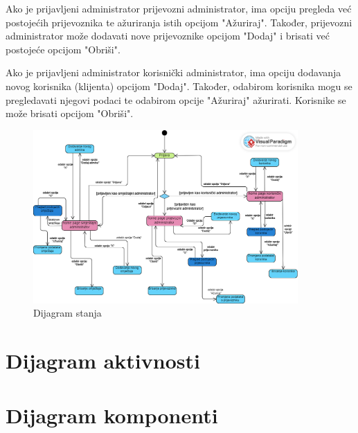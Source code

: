 			Ako je prijavljeni administrator prijevozni administrator, ima opciju pregleda već postojećih prijevoznika te ažuriranja istih opcijom "Ažuriraj". Također, prijevozni administrator može dodavati nove prijevoznike opcijom "Dodaj" i brisati već postojeće opcijom "Obriši".
			
			Ako je prijavljeni administrator korisnički administrator, ima opciju dodavanja novog korisnika (klijenta) opcijom "Dodaj". Također, odabirom korisnika mogu se pregledavati njegovi podaci te odabirom opcije "Ažuriraj" ažurirati. Korisnike se može brisati opcijom "Obriši".
			
			\begin{figure}[htbp]
				\centering
				\includegraphics[width=0.9\textwidth]{dijagrami/dijagramStanja.png}
				\caption{Dijagram stanja}
				\label{fig:dijagramStanja}
			\end{figure}
			
			
			\eject 
		\section{Dijagram aktivnosti}
			
			 
			
			\eject
		\section{Dijagram komponenti}
		
